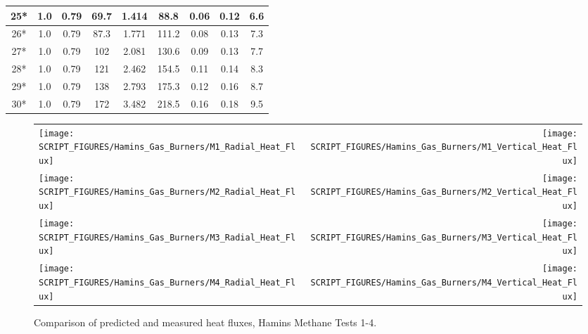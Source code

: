 \begin{table}[!ht]
\begin{center}
\begin{tabular}{|c|c|c|c|c|c|c||c|c|}
25*       & 1.0      & 0.79       & 69.7        &  1.414                &  88.8          & 0.06          & 0.12       & 6.6      \\ \hline
26*       & 1.0      & 0.79       & 87.3        &  1.771                &  111.2         & 0.08          & 0.13       & 7.3       \\ \hline
27*       & 1.0      & 0.79       & 102         &  2.081                &  130.6         & 0.09          & 0.13       & 7.7       \\ \hline
28*       & 1.0      & 0.79       & 121         &  2.462                &  154.5         & 0.11          & 0.14       & 8.3       \\ \hline
29*       & 1.0      & 0.79       & 138         &  2.793                &  175.3         & 0.12          & 0.16       & 8.7       \\ \hline
30*       & 1.0      & 0.79       & 172         &  3.482                &  218.5         & 0.16          & 0.18       & 9.5       \\ \hline
\end{tabular}
\end{center}
\label{Hamins_Methane_Table}
\end{table}

\newpage

\begin{figure}[p]
\begin{tabular*}{\textwidth}{l@{\extracolsep{\fill}}r}
\texttt{[image: SCRIPT\_FIGURES/Hamins\_Gas\_Burners/M1\_Radial\_Heat\_Flux]} &
\texttt{[image: SCRIPT\_FIGURES/Hamins\_Gas\_Burners/M1\_Vertical\_Heat\_Flux]} \\
\texttt{[image: SCRIPT\_FIGURES/Hamins\_Gas\_Burners/M2\_Radial\_Heat\_Flux]} &
\texttt{[image: SCRIPT\_FIGURES/Hamins\_Gas\_Burners/M2\_Vertical\_Heat\_Flux]} \\
\texttt{[image: SCRIPT\_FIGURES/Hamins\_Gas\_Burners/M3\_Radial\_Heat\_Flux]} &
\texttt{[image: SCRIPT\_FIGURES/Hamins\_Gas\_Burners/M3\_Vertical\_Heat\_Flux]} \\
\texttt{[image: SCRIPT\_FIGURES/Hamins\_Gas\_Burners/M4\_Radial\_Heat\_Flux]} &
\texttt{[image: SCRIPT\_FIGURES/Hamins\_Gas\_Burners/M4\_Vertical\_Heat\_Flux]}
\end{tabular*}
\label{Hamins_Methane_1-4}
\caption[Heat flux predictions, Hamins methane burner Tests 1-4]
{Comparison of predicted and measured heat fluxes, Hamins Methane Tests 1-4.}
\end{figure}

